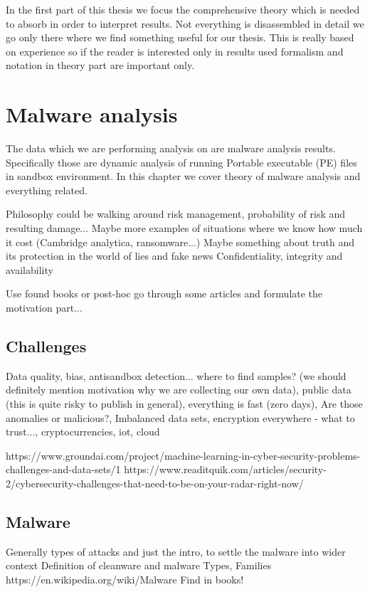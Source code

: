 In the first part of this thesis we focus the comprehensive theory which is needed to absorb in order to interpret results. Not everything is disassembled in detail we go only there where we find something useful for our thesis. This is really based on experience so if the reader is interested only in results used formalism and notation in theory part are important only.

\chapter{Malware analysis}
The data which we are performing analysis on are malware analysis results. Specifically those are dynamic analysis of running Portable executable (PE) files in sandbox environment. In this chapter we cover theory of malware analysis and everything related. 

Philosophy could be walking around risk management, probability of risk and resulting damage... Maybe more examples of situations where we know how much it cost (Cambridge analytica, ransomware...)
Maybe something about truth and its protection in the world of lies and fake news
Confidentiality, integrity and availability

Use found books or post-hoc go through some articles and formulate the motivation part...


\section{Challenges}
Data quality, bias, antisandbox detection... where to find samples? (we should definitely mention motivation why we are collecting our own data), public data (this is quite risky to publish in general), everything is fast (zero days), Are those anomalies or malicious?, Imbalanced data sets, encryption everywhere - what to trust..., cryptocurrencies, iot, cloud

https://www.groundai.com/project/machine-learning-in-cyber-security-problems-challenges-and-data-sets/1
https://www.readitquik.com/articles/security-2/cybersecurity-challenges-that-need-to-be-on-your-radar-right-now/


\section{Malware}
Generally types of attacks and just the intro, to settle the malware into wider context
Definition of cleanware and malware
Types, Families
https://en.wikipedia.org/wiki/Malware
Find in books!

